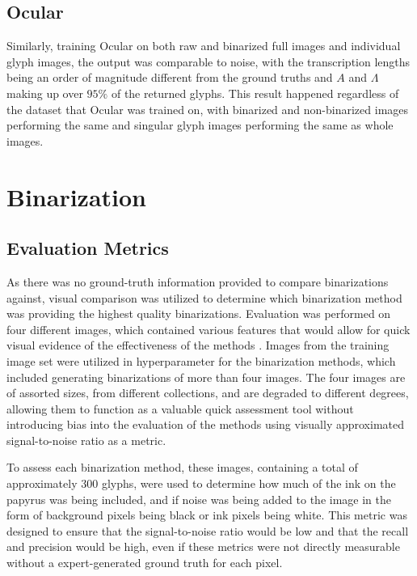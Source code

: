 \subsection{Ocular}

Similarly, training Ocular on both raw and binarized full images and individual glyph images, the output was comparable to noise, with the transcription lengths being an order of magnitude different from the ground truths and $A$ and $\Lambda$ making up over $95\%$ of the returned glyphs. This result happened regardless of the dataset that Ocular was trained on, with binarized and non-binarized images performing the same and singular glyph images performing the same as whole images.

\section{Binarization}

\subsection{Evaluation Metrics}

As there was no ground-truth information provided to compare binarizations against, visual comparison was utilized to determine which binarization method was providing the highest quality binarizations. Evaluation was performed on four different images, which contained various features that would allow for quick visual evidence of the effectiveness of the methods . Images from the training image set were utilized in hyperparameter for the binarization methods, which included generating binarizations of more than four images. The four images are of assorted sizes, from different collections, and are degraded to different degrees, allowing them to function as a valuable quick assessment tool without introducing bias into the evaluation of the methods using visually approximated signal-to-noise ratio as a metric.

To assess each binarization method, these images, containing a total of approximately $300$ glyphs, were used to determine how much of the ink on the papyrus was being included, and if noise was being added to the image in the form of background pixels being black or ink pixels being white. This metric was designed to ensure that the signal-to-noise ratio would be low and that the recall and precision would be high, even if these metrics were not directly measurable without a expert-generated ground truth for each pixel.

